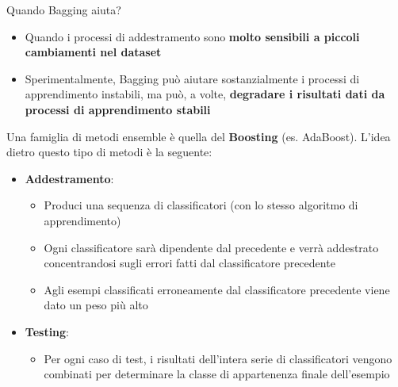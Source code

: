 \documentclass[12pt]{article}
\begin{document}
Quando Bagging aiuta?
\begin{itemize}
    \item Quando i processi di addestramento sono \textbf{molto sensibili a piccoli cambiamenti nel dataset}
    \item Sperimentalmente, Bagging può aiutare sostanzialmente i processi di apprendimento instabili, ma può, a volte, \textbf{degradare i risultati dati da processi di apprendimento stabili}
\end{itemize}
Una famiglia di metodi ensemble è quella del \textbf{Boosting} (es. AdaBoost).
L'idea dietro questo tipo di metodi è la seguente:
\begin{itemize}
    \item \textbf{Addestramento}:
    \begin{itemize}
        \item Produci una sequenza di classificatori (con lo stesso algoritmo di apprendimento)
        \item Ogni classificatore sarà dipendente dal precedente e verrà addestrato concentrandosi sugli errori fatti dal classificatore precedente
        \item Agli esempi classificati erroneamente dal classificatore precedente viene dato un peso più alto
    \end{itemize}
    \item \textbf{Testing}:
    \begin{itemize}
        \item Per ogni caso di test, i risultati dell'intera serie di classificatori vengono combinati per determinare la classe di appartenenza finale dell'esempio
    \end{itemize}
\end{itemize}
\end{document}
